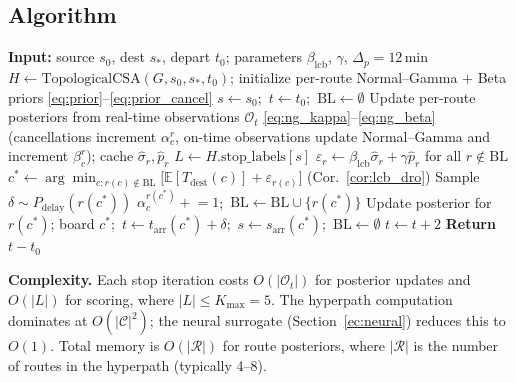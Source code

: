 \documentclass[opre,dblanonrev]{informs4}
\begin{document}
\subsection{Algorithm}

\begin{algorithm}[t]
\caption{DRO Hyperpath Routing (LCB-V1)}
\label{alg:dro}
\begin{algorithmic}[1]
\STATE \textbf{Input:} source $s_0$, dest $s_*$, depart $t_0$;
       parameters $\beta_{\mathrm{lcb}}$, $\gamma$, $\Delta_p{=}12$\,min
\STATE $H \gets \mathrm{TopologicalCSA}(G, s_0, s_*, t_0)$;
       initialize per-route Normal--Gamma + Beta priors
       \eqref{eq:prior}--\eqref{eq:prior_cancel}
\STATE $s \gets s_0$;\ $t \gets t_0$;\ $\mathrm{BL} \gets \emptyset$
    \STATE Update per-route posteriors from real-time observations
           $\mathcal{O}_t$
           \eqref{eq:ng_kappa}--\eqref{eq:ng_beta} (cancellations
           increment $\alpha_c^r$, on-time observations update
           Normal--Gamma and increment $\beta_c^r$); cache
           $\hat\sigma_r,\hat p_r$
    \STATE $L \gets H.\mathrm{stop\_labels}[s]$
    \REPEAT
        \STATE $\varepsilon_r \gets \beta_{\mathrm{lcb}}\hat\sigma_r
               + \gamma\hat p_r$ for all $r \notin \mathrm{BL}$
        \STATE $c^* \gets \arg\min_{c: r(c)\notin\mathrm{BL}}
               \bigl[\mathbb{E}[T_{\mathrm{dest}}(c)] + \varepsilon_{r(c)}\bigr]$
               \quad (Cor.~\ref{cor:lcb_dro})
        \STATE Sample $\delta \sim P_{\mathrm{delay}}(r(c^*))$
        \IF{$\delta {=} \infty$}
            \STATE $\alpha_c^{r(c^*)} \mathrel{+}{=} 1$;\
                   $\mathrm{BL} \gets \mathrm{BL} \cup \{r(c^*)\}$
            \STATE Update posterior for $r(c^*)$; board $c^*$;\
                   $t \gets t_{\mathrm{arr}}(c^*)+\delta$;\
                   $s \gets s_{\mathrm{arr}}(c^*)$;\ $\mathrm{BL} \gets \emptyset$
        \ELSE
            \STATE $t \gets t + 2$
        \ENDIF
\ENDWHILE
\STATE \textbf{Return} $t - t_0$
\end{algorithmic}
\end{algorithm}

\noindent\textbf{Complexity.}
Each stop iteration costs $O(|\mathcal{O}_t|)$ for posterior updates
and $O(|L|)$ for scoring, where $|L| \leq K_{\max} = 5$.
The hyperpath computation dominates at $O(|\mathcal{C}|^2)$;
the neural surrogate (Section~\ref{ec:neural}) reduces this to $O(1)$.
Total memory is $O(|\mathcal{R}|)$ for route posteriors, where $|\mathcal{R}|$
is the number of routes in the hyperpath (typically 4--8).
\end{document}
